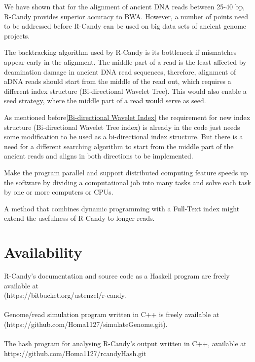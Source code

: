 \documentclass[11pt,a4paper]{report}
\begin{document}
We have shown that for the alignment of ancient DNA reads between 25-40 
bp, R-Candy provides superior accuracy to BWA. However, a number of points 
need to be addressed before R-Candy can be used on big data sets of ancient
genome projects. 


The backtracking algorithm used by R-Candy is its bottleneck if mismatches 
appear early in the alignment. The middle part of a read is the least
affected by deamination damage in ancient DNA read sequences,
therefore, alignment of aDNA reads should start from the middle of the 
read out, which requires a different index structure (Bi-directional Wavelet 
Tree). This would also enable a seed strategy, where the middle part of a read
would serve as seed.

As mentioned before\ref{Bi-directional Wavelet Index} the requirement for new index
structure (Bi-directional Wavelet Tree index) is already in the code just
needs some modification to be used as a bi-directional index structure. 
But there is a need for a different searching algorithm to start from the 
middle part of the ancient reads and aligns in both directions to be implemented.


Make the program parallel and support distributed computing feature
speeds up the software by dividing a computational job into many tasks 
and solve each task by one or more computers or CPUs.

A method that combines dynamic programming with a Full-Text index might 
extend the usefulness of R-Candy to longer reads.


\section{Availability} \label{Availability}

R-Candy's documentation and source code as a Haskell program are freely
available at\\
 (https://bitbucket.org/ustenzel/r-candy.
\\\\
Genome/read simulation program written in C++ is freely available at
(https://github.com/Homa1127/simulateGenome.git).
\\\\
The hash program for analysing R-Candy's output written in C++, available at
https://github.com/Homa1127/rcandyHash.git
\end{document}

